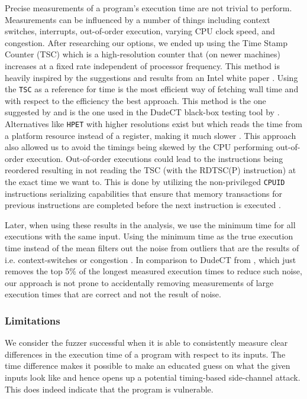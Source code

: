 Precise measurements of a program's execution time are not trivial to perform. 
Measurements can be influenced by a number of things including context switches, interrupts, out-of-order execution, varying CPU clock speed, and congestion. 
After researching our options, we ended up using the Time Stamp Counter (TSC) which is a high-resolution counter that (on newer machines) increases at a fixed rate independent of processor frequency. 
This method is heavily inspired by the suggestions and results from an Intel white paper \citep{intel-benchmark-code-execution}.
Using the \texttt{TSC} as a reference for time is the most efficient way of fetching wall time and with respect to the efficiency the best approach.
This method is the one suggested by \citep{intel-benchmark-code-execution} and is the one used in the DudeCT black-box testing tool by \citep{dudect}.
Alternatives like \texttt{HPET} with higher resolutions exist but which reads the time from a platform resource instead of a register, making it much slower \citep[b]{intel-reference}.
This approach also allowed us to avoid the timings being skewed by the CPU performing out-of-order execution.
Out-of-order executions could lead to the instructions being reordered resulting in not reading the TSC (with the RDTSC(P) instruction) at the exact time we want to. 
This is done by utilizing the non-privileged \texttt{CPUID} instructions serializing capabilities that ensure that memory transactions for previous instructions are completed before the next instruction is executed \citep[a]{intel-reference}.

Later, when using these results in the analysis, we use the minimum time for all executions with the same input.
Using the minimum time as the true execution time instead of the mean filters out the noise from outliers that are the results of i.e. context-switches or congestion \citep{robust-benchmarking}. 
In comparison to DudeCT from \citep{dudect}, which just removes the top 5\% of the longest measured execution times to reduce such noise, our approach is not prone to accidentally removing measurements of large execution times that are correct and not the result of noise.

\subsubsection{Limitations}
We consider the fuzzer successful when it is able to consistently measure clear differences in the execution time of a program with respect to its inputs. 
The time difference makes it possible to make an educated guess on what the given inputs look like and hence opens up a potential timing-based side-channel attack. 
This does indeed indicate that the program is vulnerable.

